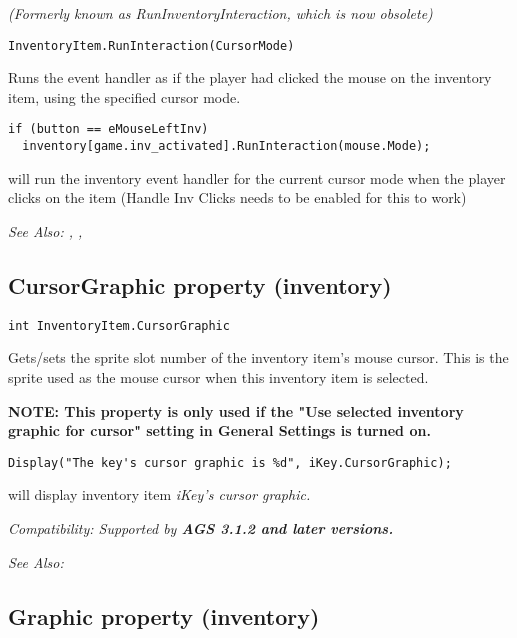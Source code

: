 \it{(Formerly known as RunInventoryInteraction, which is now obsolete)}

\begin{verbatim}
InventoryItem.RunInteraction(CursorMode)
\end{verbatim}
Runs the event handler as if the player had clicked the mouse
on the inventory item, using the specified cursor mode.

\begin{verbatim}
if (button == eMouseLeftInv)
  inventory[game.inv_activated].RunInteraction(mouse.Mode);
\end{verbatim}
will run the inventory event handler for the current cursor mode when the player clicks
on the item (Handle Inv Clicks needs to be enabled for this to work)

\it{See Also:} ,
, 


\subsection{CursorGraphic property (inventory)}\label{InventoryItem.CursorGraphic}%

\begin{verbatim}
int InventoryItem.CursorGraphic
\end{verbatim}
Gets/sets the sprite slot number of the inventory item's mouse cursor. This is
the sprite used as the mouse cursor when this inventory item is selected.

\bf{NOTE:} This property is only used if the "Use selected inventory graphic for cursor"
setting in General Settings is turned on.

\begin{verbatim}
Display("The key's cursor graphic is %d", iKey.CursorGraphic);
\end{verbatim}
will display inventory item \it{iKey}'s cursor graphic.

\it{Compatibility:} Supported by \bf{AGS 3.1.2} and later versions.

\it{See Also:} 


\subsection{Graphic property (inventory)}\label{InventoryItem.Graphic}%

